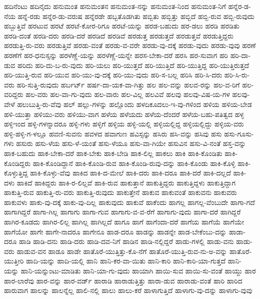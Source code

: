 {ಹದಿನೆಂಟು
ಹದಿನೈದು
ಹನುಮಂತ
ಹನುಮಂತನ
ಹನುಮಂತ-ನನ್ನು
ಹನುಮಂತ-ನಿಂದ
ಹನುಮಂತ-ನಿಗೆ
ಹನ್ನೆರ-ಡ-ನೆಯ
ಹನ್ನೆ-ರಡು
ಹನ್ನೆರ-ಡು-ವರುಷ
ಹನ್ನೆರಡೇ
ಹಬ್ಬತೊಡಗಿತು
ಹಬ್ಬಿತು
ಹಬ್ಬಿತ್ತು
ಹಬ್ಬಿದೆ
ಹಬ್ಬಿ-ರುವ
ಹಬ್ಬಿ-ರುವುದು
ಹಬ್ಬುತ್ತಿವೆ
ಹರಟುವ
ಹರಟೆ
ಹರಟೆ-ಕೋರ-ರಿಗೂ
ಹರಟೆ-ಯನ್ನು
ಹರಡ-ಬಹುದು
ಹರ-ಡಲು
ಹರಡಿ
ಹರಡಿತು
ಹರಡಿ-ದಂತೆ
ಹರಡಿ-ದರು
ಹರಡಿ-ದರೆ
ಹರಡಿದೆ
ಹರಡಿವೆ
ಹರಡುತ್ತ
ಹರಡುತ್ತದೆ
ಹರಡುತ್ತವೆ
ಹರಡುತ್ತಿದ್ದರು
ಹರಡುತ್ತಿ-ರು-ವರು
ಹರಡುತ್ತಿವೆ
ಹರಡು-ವಂತೆ
ಹರಡು-ವ-ವರೇ
ಹರಡು-ವು-ದಕ್ಕೆ
ಹರಡು-ವುದು
ಹರಡು-ವುವು
ಹರಣೆ
ಹರಣೆಗೆ
ಹರ-ಧನುಸ್ಸನ್ನು
ಹರಳೆಣ್ಣೆ-ಯನ್ನು
ಹರಳೆಣ್ಣೆ-ಯನ್ನೇ
ಹರಸ-ಬೇಕಾ-ದರೆ
ಹರಸಿ
ಹರ-ಸುವಾಗ
ಹರಿ
ಹರಿ-ದಾ-ಡುವ
ಹರಿದು
ಹರಿ-ದು-ಬ-ರು-ವುದು
ಹರಿ-ಯಲು
ಹರಿ-ಯುತ್ತದೆ
ಹರಿ-ಯುತ್ತಿದೆ
ಹರಿ-ಯುತ್ತಿದ್ದ
ಹರಿ-ಯುತ್ತಿರುತ್ತದೆ
ಹರಿ-ಯುತ್ತಿ-ರುವ
ಹರಿ-ಯುವ
ಹರಿ-ಯು-ವು-ದಕ್ಕೆ
ಹರಿ-ಯು-ವುದು
ಹರಿ-ಸ-ಬಲ್ಲ
ಹರಿಸಿ
ಹರಿ-ಸಿ-ದರು
ಹರಿ-ಸಿ-ರು-ವರು
ಹರಿ-ಸುತ್ತಿ-ರುವುದು
ಹರ್ಬರ್ಟ್
ಹರ್ಷ-ದಾ-ಯಕ-ವಾ-ಗಿತ್ತು
ಹಲ
ಹಲ-ವನ್ನು
ಹಲವ-ರನ್ನು
ಹಲ-ವ-ರಿಗೆ
ಹಲ-ವರಿದ್ದರು
ಹಲ-ವರು
ಹಲ-ವಾ-ಗು-ವುದು
ಹಲ-ವಾರು
ಹಲ-ವಿಲ್ಲ
ಹಲವಿವೆ
ಹಲವು
ಹಲವು-ವಿಷ-ಯ-ಗಳ
ಹಲವು-ವೇಳೆ
ಹಲುಬುತ್ತಿ-ರು-ವೆವು
ಹಲ್
ಹಲ್ಲು-ಗಳನ್ನು
ಹಲ್ಲೊಂದು
ಹಳದಿಕೂದಲು-ಇ-ವು-ಗಳಿಂದ
ಹಳಿಯ
ಹಳಿಯ-ಬೇಡ
ಹಳಿ-ಯುತ್ತಾ
ಹಳಿಯು-ವರು
ಹಳಿಯು-ವಾಗ
ಹಳೆಯ
ಹಳೆಯದು
ಹಳೆಯ-ದೆಂದರೆ
ಹಳೆಯ-ಬಹು-ಪತಿತ್ವದ
ಹಳ್ಳ
ಹಳ್ಳಿಇಂದ
ಹಳ್ಳಿ-ಗಳನ್ನಾದರೂ
ಹಳ್ಳಿ-ಗಳು
ಹಳ್ಳಿಗೆ
ಹಳ್ಳಿಯ
ಹಳ್ಳಿ-ಯಲ್ಲಿ
ಹಳ್ಳಿಯಲ್ಲಿದ್ದ
ಹಳ್ಳಿಯಲ್ಲಿದ್ದು
ಹಳ್ಳಿಯ-ವರು
ಹಳ್ಳಿ-ಹಳ್ಳಿ-ಗ-ಳಲ್ಲೂ
ಹವಣಿ-ಸುವನು
ಹವಳದ
ಹವಾಗುಣ
ಹವಿಸ್ಸನ್ನು
ಹಸಿರು
ಹಸಿ-ವನ್ನು
ಹಸಿವು
ಹಸು
ಹಸು-ಗೂಸು-ಗಳು
ಹಸುರು
ಹಸು-ಳೆಯ
ಹಸು-ಳೆ-ಯಂತೆ
ಹಸು-ಳೆಯೂ
ಹಸು-ವಾ-ಗಿಯೇ
ಹಸುವಿನ
ಹಸು-ವಿ-ನಂತೆ
ಹಸ್ತ-ವನ್ನು
ಹಾಕ-ಬಹುದು
ಹಾಕ-ಬೇಕಾ-ದರೆ
ಹಾಕ-ಬೇಕು
ಹಾಕ-ಬೇಡಿ
ಹಾಕ-ಲಿಲ್ಲ
ಹಾಕಲು
ಹಾಕಿ
ಹಾಕಿ-ಕೊಂಡಿತು
ಹಾಕಿ-ಕೊಂಡಿದ್ದರು
ಹಾಕಿ-ಕೊಂಡಿದ್ದಾನೆ
ಹಾಕಿ-ಕೊಂಡಿ-ರುವ
ಹಾಕಿ-ಕೊಂಡಿ-ರುವು-ದನ್ನು
ಹಾಕಿ-ಕೊಂಡು
ಹಾಕಿ-ಕೊಳ್ಳಿ
ಹಾಕಿ-ಕೊಳ್ಳುತ್ತಿದ್ದ
ಹಾಕಿ-ಕೊಳ್ಳು-ವೆವು
ಹಾಕಿದ
ಹಾಕಿ-ದ-ಮೇಲೆ
ಹಾಕಿ-ದರು
ಹಾಕಿ-ದರೂ
ಹಾಕಿ-ದರೆ
ಹಾಕಿ-ದಲ್ಲದೆ
ಹಾಕಿ-ದಳು
ಹಾಕಿದೆ
ಹಾಕಿದ್ದರು
ಹಾಕಿ-ರ-ಲಿಲ್ಲವೆ
ಹಾಕಿ-ರುವ
ಹಾಕುತ್ತಾನೆ
ಹಾಕುತ್ತಿದ್ದರು
ಹಾಕುತ್ತಿದ್ದಳು
ಹಾಕುತ್ತಿದ್ದಾಗ
ಹಾಕುತ್ತಿ-ರುವ
ಹಾಕುತ್ತಿ-ರು-ವರು
ಹಾಕುತ್ತಿ-ರುವುದು
ಹಾಕುತ್ತೇನೆ
ಹಾಕುವ
ಹಾಕುವಂತೆ
ಹಾಕುವನು
ಹಾಕುವರು
ಹಾಕುವಳು
ಹಾಕು-ವು-ದಕ್ಕೆ
ಹಾಕು-ವು-ದಿಲ್ಲ
ಹಾಕುವುದು
ಹಾಕುವೆ
ಹಾಕೆಂದು
ಹಾಗಲ್ಲ
ಹಾಗಲ್ಲ-ವೆಂಬುದೇ
ಹಾಗಾ-ಗದೆ
ಹಾಗಾಗಿದ್ದರೆ
ಹಾಗಾ-ಗಿಲ್ಲ
ಹಾಗಾಗು
ಹಾಗಾ-ಗುವ
ಹಾಗಾಗು-ವ-ವ-ರೆಗೆ
ಹಾಗಾಗು-ವುದು
ಹಾಗಾ-ದರೆ
ಹಾಗಿದ್ದರೆ
ಹಾಗಿರ-ಕೂಡದು
ಹಾಗಿರ-ಲಿಲ್ಲ
ಹಾಗಿಲ್ಲ
ಹಾಗಿಲ್ಲದೆ
ಹಾಗೂ
ಹಾಗೆ
ಹಾಗೆಂದಾ-ದರೆ
ಹಾಗೆಯ
ಹಾಗೆಯೆ
ಹಾಗೆಯೇ
ಹಾಗೆಯೋ
ಹಾಗೇ
ಹಾಗೇ-ನಾದರೂ
ಹಾಗೇನೂ
ಹಾಡ-ದರೂ
ಹಾಡನ್ನು
ಹಾಡನ್ನೇ
ಹಾಡ-ಬೇಕೆಂಬು-ದನ್ನು
ಹಾಡಾ-ದರೂ
ಹಾಡಿ
ಹಾಡಿ-ದನು
ಹಾಡಿ-ದರು
ಹಾಡಿ-ದವ-ನಿಗೆ
ಹಾಡಿನ
ಹಾಡಿ-ನಲ್ಲಿದ್ದರೆ
ಹಾಡು-ಗಳಲ್ಲಿ
ಹಾಡು-ವನು
ಹಾಡು-ವರು
ಹಾಡುವ-ವನ
ಹಾಡೂ
ಹಾಡೇ
ಹಾತೊರೆ-ಯುತ್ತಿತ್ತು-ಕೊ-ನೆಗೆ
ಹಾತೊರೆ-ಯುತ್ತಿ-ರುವ-ನು-ಅ-ವನ್ನು
ಹಾತೊರೆ-ಯುತ್ತೀರಿ
ಹಾದಿ-ಯನ್ನು
ಹಾದಿ-ಯಲ್ಲಿ
ಹಾನಿ
ಹಾನಿ-ಕರ-ವಾ-ಯಿತು
ಹಾನಿ-ಕಾರಿ
ಹಾನಿ-ಕಾರಿ-ಯಾ-ಗುತ್ತದೆ
ಹಾನಿ-ಯನ್ನು
ಹಾನಿ-ಯನ್ನುಂಟು-ಮಾಡಿತು
ಹಾನಿ-ಯಾ-ಗು-ವುದು
ಹಾಯಾಗಿ
ಹಾಯಿ-ಸುವ
ಹಾಯಿ-ಸು-ವಂತೆ
ಹಾಯ್ದು
ಹಾರ
ಹಾರ-ಲಾರೆವು
ಹಾರ-ವನ್ನು
ಹಾರ-ವರ್ಡ್
ಹಾರಾಡಿ
ಹಾರಾಡುತ್ತಿತ್ತು
ಹಾರಾ-ಡುವ
ಹಾರಾಡು-ವಂತೆ
ಹಾರಿ
ಹಾರಿದ
ಹಾರುವಾಗ
ಹಾಲನ್ನು
ಹಾಲನ್ನೆಲ್ಲ
ಹಾಲಿ-ನಲ್ಲಿ
ಹಾಲು
ಹಾಲು-ಕರೆ
ಹಾಳಾಗುತ್ತಿದೆ
ಹಾಳಾಗು-ವು-ದನ್ನು
ಹಾಳಾಗು-ವುವು
}
